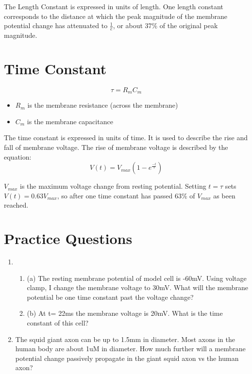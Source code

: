 \documentclass[a4paper,9pt]{extarticle}
\begin{document}
\begin{multicols*}{2}
The Length Constant is expressed in units of length. One length constant corresponds to the distance at which the peak magnitude of the membrane potential change has attenuated to $\frac{1}{e}$, or about 37\% of the original peak magnitude.

\vfill\null
\columnbreak 
\section*{Time Constant}

$$\tau = R_mC_m$$
\begin{itemize}
\setlength\itemsep{.5em}
  \item $R_m$ is the membrane resistance (across the membrane)
  \item $C_m$ is the membrane capacitance
\end{itemize}
The time constant is expressed in units of time. It is used to describe the rise and fall of membrane voltage. The rise of membrane voltage is described by the equation: 
$$V(t) = V_{max}(1-e^{\frac{-t}{\tau}})$$

$V_{max}$ is the maximum voltage change from resting potential. Setting $t = \tau$ sets $V(t) = 0.63V_{max}$, so after one time constant has passed 63\% of $V_{max}$ as been reached.

\section*{Practice Questions}
\begin{enumerate}
  \item 
  \begin{enumerate} This problem is using the same model cell we described last week.
     \item(a) The resting membrane potential of model cell is -60mV. Using voltage clamp, I change the membrane voltage to 30mV. What will the membrane potential be one time constant past the voltage change? %
     \item(b) At t= 22ms the membrane voltage is 20mV. What is the time constant of this cell?
     \end{enumerate}
    \item The squid giant axon can be up to 1.5mm in diameter. Most axons in the human body are about 1uM in diameter. How much further will a membrane potential change passively propagate in the giant squid axon vs the human axon? %
\end{enumerate}

\end{multicols*}
\end{document}
